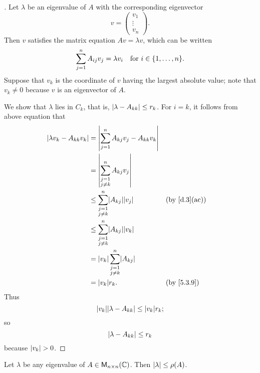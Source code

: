 \begin{proof}[]
	Let \(\lambda\) be an eigenvalue of \(A\) with the corresponding eigenvector
	\[
		v = \begin{pmatrix}
			v_1    \\
			\vdots \\
			v_n
		\end{pmatrix}.
	\]
	Then \(v\) satisfies the matrix equation \(Av = \lambda v\), which can be written
	\[
		\sum_{j = 1}^n A_{i j} v_j = \lambda v_i \quad \text{for } i \in \set{1, \dots, n}.
	\]
	Suppose that \(v_k\) is the coordinate of \(v\) having the largest absolute value;
	note that \(v_k \neq 0\) because \(v\) is an eigenvector of \(A\).

	We show that \(\lambda\) lies in \(C_k\), that is, \(\left\lvert\lambda - A_{k k}\right\rvert \leq r_k\).
	For \(i = k\), it follows from above equation that
	\begin{align*}
		\abs{\lambda v_k - A_{k k} v_k} & = \abs{\sum_{j = 1}^n A_{k j} v_j - A_{k k} v_k}                 \\
		                                & = \abs{\sum_{\substack{j = 1                                     \\ j \neq k}}^n A_{k j} v_j}              \\
		                                & \leq \sum_{\substack{j = 1                                       \\ j \neq k}}^n \abs{A_{k j}} \abs{v_j}    && \by{d.3}[ac] \\
		                                & \leq \sum_{\substack{j = 1                                       \\ j \neq k}}^n \abs{A_{k j}} \abs{v_k}     \\
		                                & = \abs{v_k} \sum_{\substack{j = 1                                \\ j \neq k}}^n \abs{A_{k j}}        \\
		                                & = \abs{v_k} r_k.                                 &  & \by{5.3.9}
	\end{align*}
	Thus
	\[
		\abs{v_k} \abs{\lambda - A_{k k}} \leq \abs{v_k} r_k;
	\]
	so
	\[
		\left\lvert\lambda - A_{k k}\right\rvert \leq r_k
	\]
	because \(\left\lvert v_k\right\rvert > 0\).
\end{proof}

\begin{cor}\label{5.3.10}
	Let \(\lambda\) be any eigenvalue of \(A \in \mathsf{M}_{{n} \times n}({\mathbb{C}})\).
	Then \(\left\lvert\lambda\right\rvert \leq \rho(A)\).
\end{cor}

